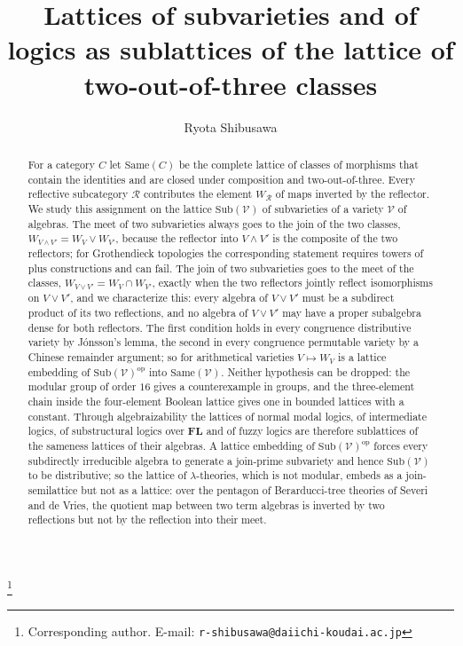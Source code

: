\documentclass[11pt]{amsart}
\theoremstyle{definition}
\newcommand{\Same}{\mathrm{Same}}
\newcommand{\Sub}{\mathrm{Sub}}
\newcommand{\sV}{\mathcal V}
\newcommand{\sR}{\mathcal R}
\begin{document}
\title[Subvarieties and logics in the sameness lattice]{Lattices of subvarieties and of logics as sublattices of the lattice of two-out-of-three classes}
\author{Ryota Shibusawa}
\thanks{Corresponding author. E-mail: \texttt{r-shibusawa@daiichi-koudai.ac.jp}}
\address{Daiichi Institute of Technology}

\begin{abstract}
For a category $C$ let $\Same(C)$ be the complete lattice of classes of
morphisms that contain the identities and are closed under composition and
two-out-of-three. Every reflective subcategory $\sR$ contributes the element
$W_{\sR}$ of maps inverted by the reflector. We study this assignment on the
lattice $\Sub(\sV)$ of subvarieties of a variety $\sV$ of algebras. The meet of
two subvarieties always goes to the join of the two classes,
$W_{V\wedge V'}=W_V\vee W_{V'}$, because the reflector into $V\wedge V'$ is the
composite of the two reflectors; for Grothendieck topologies the corresponding
statement requires towers of plus constructions and can fail. The join of two
subvarieties goes to the meet of the classes, $W_{V\vee V'}=W_V\cap W_{V'}$,
exactly when the two reflectors jointly reflect isomorphisms on $V\vee V'$,
and we characterize this: every algebra of $V\vee V'$ must be a subdirect
product of its two reflections, and no algebra of $V\vee V'$ may have a
proper subalgebra dense for both reflectors. The first condition holds in
every congruence distributive variety by Jónsson's lemma, the second in
every congruence permutable variety by a Chinese remainder argument; so for
arithmetical varieties $V\mapsto W_V$ is a lattice embedding of
$\Sub(\sV)^{\mathrm{op}}$ into $\Same(\sV)$. Neither hypothesis can be dropped: the modular group of order
$16$ gives a counterexample in groups, and the three-element chain inside the
four-element Boolean lattice gives one in bounded lattices with a constant.
Through algebraizability the lattices of normal modal logics, of intermediate
logics, of substructural logics over $\mathbf{FL}$ and of fuzzy logics are
therefore sublattices of the sameness lattices of their algebras. A lattice
embedding of $\Sub(\sV)^{\mathrm{op}}$ forces every subdirectly irreducible
algebra to generate a join-prime subvariety and hence $\Sub(\sV)$ to be
distributive; so the lattice of $\lambda$-theories, which is not modular,
embeds as a join-semilattice but not as a lattice: over the pentagon of
Berarducci-tree theories of Severi and de Vries, the quotient map between two
term algebras is inverted by two reflections but not by the reflection into
their meet.
\end{abstract}
\end{document}
